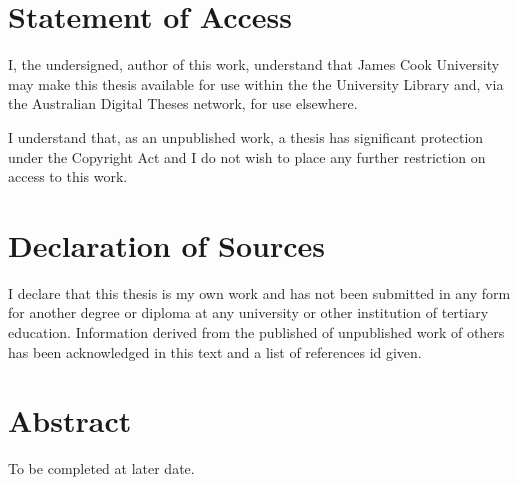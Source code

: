 \documentclass[12pt]{article}
\begin{document}
\section*{Statement of Access}
I, the undersigned, author of this work, understand that James Cook University may make this thesis available for use within the the University Library and, via the Australian Digital Theses network, for use elsewhere. \\ 
\vspace{2cm}

I understand that, as an unpublished work, a thesis has significant protection under the Copyright Act and I do not wish to place any further restriction on access to this work. \\ 
\vspace{5cm}



\pagebreak

\section*{Declaration of Sources}
I declare that this thesis is my own work and has not been submitted in any form for another degree or diploma at any university or other institution of tertiary education. Information derived from the published of unpublished work of others has been acknowledged in this text and a list of references id given. 

\pagebreak

\section*{Abstract}

{\color{red} To be completed at later date.} 
\pagebreak
\end{document}
